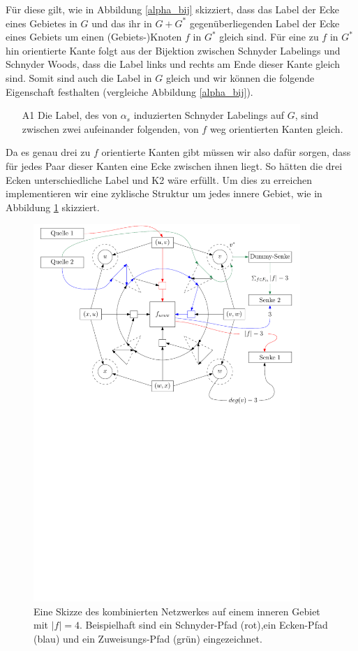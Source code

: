 Für diese gilt, wie in Abbildung \ref{alpha_bij} skizziert, dass das Label der Ecke eines Gebietes in $G$ und das ihr in $G+G^*$ gegenüberliegenden Label der Ecke eines Gebiets um einen (Gebiets-)Knoten $f$ in $G^*$ gleich sind. Für eine zu $f$ in $G^*$ hin orientierte Kante folgt aus der Bijektion zwischen Schnyder Labelings und Schnyder Woods, dass die Label links und rechts am Ende dieser Kante gleich sind. Somit sind auch die Label in $G$ gleich und wir können die folgende Eigenschaft festhalten (vergleiche Abbildung \ref{alpha_bij}).

\begin{itemize}
\item [A1] Die Label, des von $\alpha_s$ induzierten Schnyder Labelings auf $G$, sind zwischen zwei aufeinander folgenden, von $f$ weg orientierten Kanten gleich.
\end{itemize}

Da es genau drei zu $f$ orientierte Kanten gibt müssen wir also dafür sorgen, dass für jedes Paar dieser Kanten eine Ecke zwischen ihnen liegt. So hätten die drei Ecken unterschiedliche Label und K2 wäre erfüllt. Um dies zu erreichen implementieren wir eine zyklische Struktur um jedes innere Gebiet, wie in Abbildung \ref{combined_face_sketch} skizziert.

\begin{figure}[h]
	\centering
  	\includegraphics[width=0.9\textwidth]{combined_face_sketch.pdf}
  	\caption{Eine Skizze des kombinierten Netzwerkes auf einem inneren Gebiet mit $|f| = 4$. Beispielhaft sind ein Schnyder-Pfad (rot),ein Ecken-Pfad (blau) und ein Zuweisungs-Pfad (grün) eingezeichnet. }
	\label{combined_face_sketch}
\end{figure}

